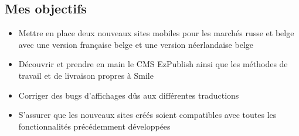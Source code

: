 \documentclass[a4paper,11pt,twoside]{report}
\begin{document}
    \subsection*{Mes objectifs}
      \begin{itemize}

	\item Mettre en place deux nouveaux sites mobiles pour les marchés russe et belge avec une version française belge et une version néerlandaise belge
	\item Découvrir et prendre en main le CMS EzPublish ainsi que les méthodes de travail et de livraison propres à Smile
	\item Corriger des bugs d'affichages dûs aux différentes traductions
	\item S'assurer que les nouveaux sites créés soient compatibles avec toutes les fonctionnalités précédemment développées

      \end{itemize}
\end{document}
